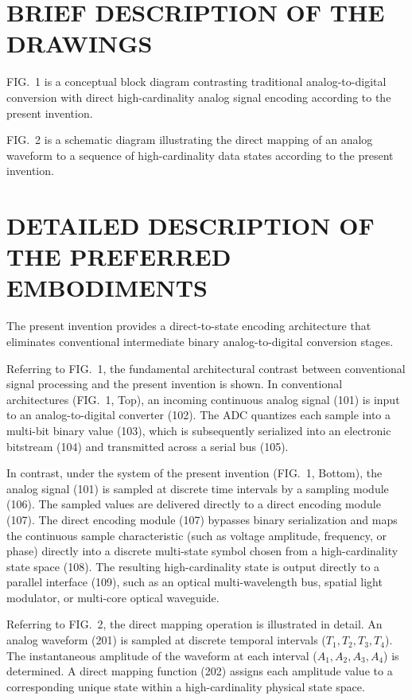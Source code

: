 \documentclass[11pt,letterpaper]{article}
\begin{document}
\section*{BRIEF DESCRIPTION OF THE DRAWINGS}

\noindent FIG.~1 is a conceptual block diagram contrasting traditional analog-to-digital conversion with direct high-cardinality analog signal encoding according to the present invention.

\noindent FIG.~2 is a schematic diagram illustrating the direct mapping of an analog waveform to a sequence of high-cardinality data states according to the present invention.

\section*{DETAILED DESCRIPTION OF THE PREFERRED EMBODIMENTS}

The present invention provides a direct-to-state encoding architecture that eliminates conventional intermediate binary analog-to-digital conversion stages.

Referring to FIG.~1, the fundamental architectural contrast between conventional signal processing and the present invention is shown. In conventional architectures (FIG.~1, Top), an incoming continuous analog signal (101) is input to an analog-to-digital converter (102). The ADC quantizes each sample into a multi-bit binary value (103), which is subsequently serialized into an electronic bitstream (104) and transmitted across a serial bus (105).

In contrast, under the system of the present invention (FIG.~1, Bottom), the analog signal (101) is sampled at discrete time intervals by a sampling module (106). The sampled values are delivered directly to a direct encoding module (107). The direct encoding module (107) bypasses binary serialization and maps the continuous sample characteristic (such as voltage amplitude, frequency, or phase) directly into a discrete multi-state symbol chosen from a high-cardinality state space (108). The resulting high-cardinality state is output directly to a parallel interface (109), such as an optical multi-wavelength bus, spatial light modulator, or multi-core optical waveguide.

Referring to FIG.~2, the direct mapping operation is illustrated in detail. An analog waveform (201) is sampled at discrete temporal intervals ($T_1, T_2, T_3, T_4$). The instantaneous amplitude of the waveform at each interval ($A_1, A_2, A_3, A_4$) is determined. A direct mapping function (202) assigns each amplitude value to a corresponding unique state within a high-cardinality physical state space.
\end{document}
